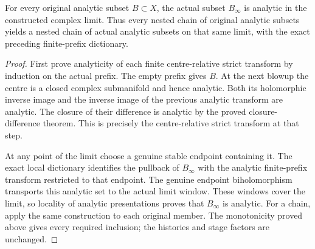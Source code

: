 \begin{theorem}
\label{hir:actual-lf-limit-analytic-centre-relative-strict-transforms}
\leanok
For every original analytic subset $B\subset X$, the actual subset
$B_\infty$ is analytic in the constructed complex limit. Thus every nested
chain of original analytic subsets yields a nested chain of actual analytic
subsets on that same limit, with the exact preceding finite-prefix dictionary.
\end{theorem}
\begin{proof}
First prove analyticity of each finite centre-relative strict transform by
induction on the actual prefix. The empty prefix gives $B$. At the next
blowup the centre is a closed complex submanifold and hence analytic.
Both its holomorphic inverse image and the inverse image of the previous
analytic transform are analytic. The closure of their difference is
analytic by the proved closure-difference theorem. This is precisely the
centre-relative strict transform at that step.

At any point of the limit choose a genuine stable endpoint containing it.
The exact local dictionary identifies the pullback of $B_\infty$ with the
analytic finite-prefix transform restricted to that endpoint. The genuine
endpoint biholomorphism transports this analytic set to the actual limit
window. These windows cover the limit, so locality of analytic presentations
proves that $B_\infty$ is analytic. For a chain, apply the same construction
to each original member. The monotonicity proved above gives every required
inclusion; the histories and stage factors are unchanged.
\end{proof}


